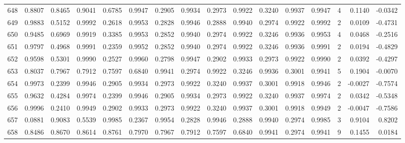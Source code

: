 \begin{tabular}{lrrrrrrrrrrrrrrr}
648 &      0.8807 &  0.8465 &  0.9041 &  0.6785 &  0.9947 &  0.2905 &  0.9934 &  0.2973 &  0.9922 &  0.3240 &   0.9937 &     0.9947 &      4 &                    0.1140 &                    -0.0342 \\
649 &      0.9883 &  0.5152 &  0.9992 &  0.2618 &  0.9953 &  0.2828 &  0.9946 &  0.2888 &  0.9940 &  0.2974 &   0.9922 &     0.9992 &      2 &                    0.0109 &                    -0.4731 \\
650 &      0.9485 &  0.6969 &  0.9919 &  0.3385 &  0.9953 &  0.2852 &  0.9940 &  0.2974 &  0.9922 &  0.3246 &   0.9936 &     0.9953 &      4 &                    0.0468 &                    -0.2516 \\
651 &      0.9797 &  0.4968 &  0.9991 &  0.2359 &  0.9952 &  0.2852 &  0.9940 &  0.2974 &  0.9922 &  0.3246 &   0.9936 &     0.9991 &      2 &                    0.0194 &                    -0.4829 \\
652 &      0.9598 &  0.5301 &  0.9990 &  0.2527 &  0.9960 &  0.2798 &  0.9947 &  0.2902 &  0.9933 &  0.2973 &   0.9922 &     0.9990 &      2 &                    0.0392 &                    -0.4297 \\
653 &      0.8037 &  0.7967 &  0.7912 &  0.7597 &  0.6840 &  0.9941 &  0.2974 &  0.9922 &  0.3246 &  0.9936 &   0.3001 &     0.9941 &      5 &                    0.1904 &                    -0.0070 \\
654 &      0.9973 &  0.2399 &  0.9946 &  0.2905 &  0.9934 &  0.2973 &  0.9922 &  0.3240 &  0.9937 &  0.3001 &   0.9918 &     0.9946 &      2 &                   -0.0027 &                    -0.7574 \\
655 &      0.9632 &  0.4284 &  0.9974 &  0.2399 &  0.9946 &  0.2905 &  0.9934 &  0.2973 &  0.9922 &  0.3240 &   0.9937 &     0.9974 &      2 &                    0.0342 &                    -0.5348 \\
656 &      0.9996 &  0.2410 &  0.9949 &  0.2902 &  0.9933 &  0.2973 &  0.9922 &  0.3240 &  0.9937 &  0.3001 &   0.9918 &     0.9949 &      2 &                   -0.0047 &                    -0.7586 \\
657 &      0.0881 &  0.9083 &  0.5539 &  0.9985 &  0.2367 &  0.9954 &  0.2828 &  0.9946 &  0.2888 &  0.9940 &   0.2974 &     0.9985 &      3 &                    0.9104 &                     0.8202 \\
658 &      0.8486 &  0.8670 &  0.8614 &  0.8761 &  0.7970 &  0.7967 &  0.7912 &  0.7597 &  0.6840 &  0.9941 &   0.2974 &     0.9941 &      9 &                    0.1455 &                     0.0184 \\

\end{tabular}
